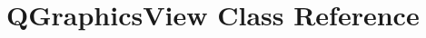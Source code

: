 \hypertarget{classGUI_1_1QtGui_1_1QGraphicsView}{}\section{Q\+Graphics\+View Class Reference}
\label{classGUI_1_1QtGui_1_1QGraphicsView}
